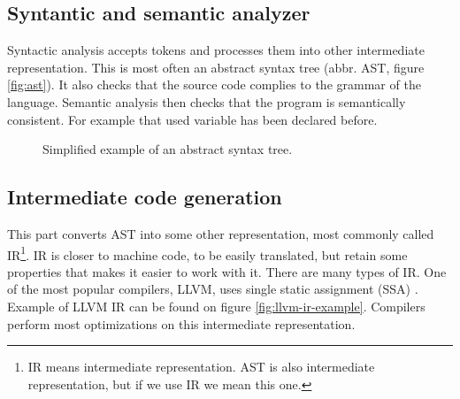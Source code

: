 \subsection{Syntantic and semantic analyzer}
Syntactic analysis accepts tokens and processes them into other intermediate representation. This is
most often an abstract syntax tree (abbr. AST, figure \ref{fig:ast}). It also checks that the source code complies to the grammar of the language.
Semantic analysis then checks that the program is semantically consistent. For example that used variable
has been declared before.

\begin{figure}\label{fig:ast}
    \centering
    \caption{Simplified example of an abstract syntax tree.}
    \label{fig:astgraph}
\end{figure}
 
\subsection{Intermediate code generation}
This part converts AST into some other representation, most commonly called IR\footnote{IR means intermediate representation.
AST is also intermediate representation, but if we use IR we mean this one.}. IR is closer to machine code, to be easily translated,
but retain some properties that makes it easier to work with it. There are many types of IR. One of the most popular compilers, LLVM, uses
single static assignment (SSA) \cite{llvm}. Example of LLVM IR can be found on figure \ref{fig:llvm-ir-example}. Compilers perform most
optimizations on this intermediate representation. 

